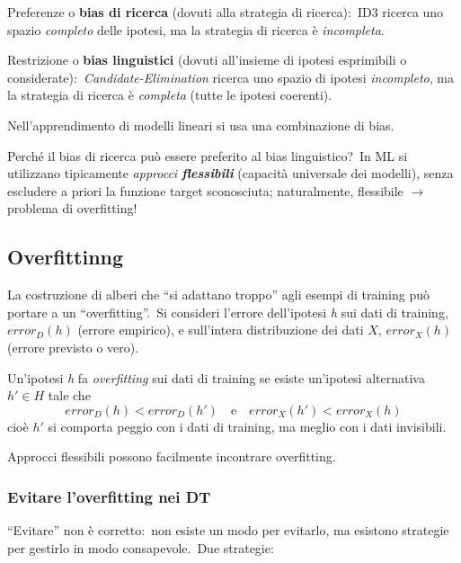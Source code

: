 \begin{flushleft}
	Preferenze o \textbf{bias di ricerca} (dovuti alla strategia di ricerca):\ ID3 ricerca uno spazio \textit{completo} delle ipotesi, ma la strategia di ricerca è \textit{incompleta}.\

	Restrizione o \textbf{bias linguistici} (dovuti all'insieme di ipotesi esprimibili o considerate):\ \textit{Candidate-Elimination} ricerca uno spazio di ipotesi \textit{incompleto}, ma la strategia di ricerca è \textit{completa} (tutte le ipotesi coerenti).\
\end{flushleft}

\noindent Nell'apprendimento di modelli lineari si usa una combinazione di bias.\

Perché il bias di ricerca può essere preferito al bias linguistico?\
In ML si utilizzano tipicamente \textit{approcci \textbf{flessibili}} (capacità universale dei modelli), senza escludere a priori la funzione target sconosciuta; naturalmente, flessibile $\rightarrow$ problema di overfitting!\

\subsection{Overfittinng}

La costruzione di alberi che ``si adattano troppo'' agli esempi di training può portare a un ``overfitting''.\
Si consideri l'errore dell'ipotesi \textit{h} sui dati di training, $error_D(h)$ (errore empirico), e sull'intera distribuzione dei dati $X$, $error_X(h)$ (errore previsto o vero).\

\begin{definition}
	Un'ipotesi \textit{h} fa \textit{overfitting} sui dati di training se esiste un'ipotesi alternativa $h' \in H$ tale che
	\[error_D (h) < error_D (h')\quad \mathrm{e}\quad error_X (h') < error_X(h)\]
	cioè $h'$ si comporta peggio con i dati di training, ma meglio con i dati invisibili.\
\end{definition}

\noindent Approcci flessibili possono facilmente incontrare overfitting.\

\subsubsection{Evitare l'overfitting nei DT}

``Evitare'' non è corretto:\ non esiste un modo per evitarlo, ma esistono strategie per gestirlo in modo consapevole.\
Due strategie:

